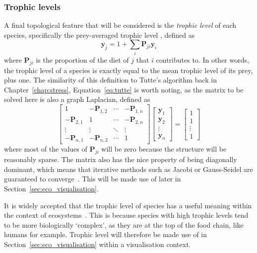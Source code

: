 \subsubsection{Trophic levels}
A final topological feature that will be considered is the \emph{trophic level} of each species, specifically the prey-averaged trophic level \cite{Williams2004}, defined as
\begin{equation}
  \mathbf{y}_j = 1 + \sum_i \mathbf{P}_{ji}\mathbf{y}_i
  \label{eq:trophic}
\end{equation}
where $\mathbf{P}_{ji}$ is the proportion of the diet of $j$ that $i$ contributes to.
In other words, the trophic level of a species is exactly equal to the mean trophic level of its prey, plus one.
The similarity of this definition to Tutte's algorithm back in Chapter~\ref{chap:stress}, Equation~\eqref{eq:tutte} is worth noting, as the matrix to be solved here is also a graph Laplacian, defined as
\begin{equation}
  \begin{bmatrix}
  1&-\mathbf{P}_{1,2}&\cdots&-\mathbf{P}_{1,n}\\
  -\mathbf{P}_{2,1}&1&\cdots&-\mathbf{P}_{2,n}\\
  \vdots&\vdots&\ddots&\vdots\\
  -\mathbf{P}_{n,1}&-\mathbf{P}_{n,2}&\cdots&1
  \end{bmatrix}
  \begin{bmatrix}
  \mathbf{y}_1\\\mathbf{y}_2\\\vdots\\\mathbf{y}_n
  \end{bmatrix}
  =
  \begin{bmatrix}
  1\\1\\\vdots\\1
  \end{bmatrix}
  \label{eq:trophic_matrix}
\end{equation}
where most of the values of $\mathbf{P}_{ji}$ will be zero because the structure will be reasonably sparse.
The matrix also has the nice property of being diagonally dominant, which means that iterative methods such as Jacobi or Gauss-Seidel are guaranteed to converge~\cite{Young2014}. This will be made use of later in Section~\ref{sec:eco_visualisation}.

It is widely accepted that the trophic level of species has a useful meaning within the context of ecosystems~\cite{Post2002, Johnson2014}. This is because species with high trophic levels tend to be more biologically `complex', as they are at the top of the food chain, like humans for example.
Trophic level will therefore be made use of in Section~\ref{sec:eco_visualisation} within a visualisation context.

